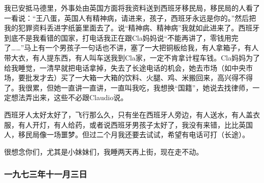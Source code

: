 \par {}
\par {}
\par 我已安抵马德里，外事处由英国方面将我资料送到西班牙移民局，移民局的人看了一看说：“王八蛋，英国人有精神病，请进来，孩子，西班牙永远是你的。”然后把我的犯罪资料丢进字纸篓里面去了。说“精神病、精神病”我就如此进来了。西班牙到底不是我看错的国家，打电话我正在跟Cla妈妈说“不能再讲了，零钱用完了……”马上有一个男孩子一句话也不讲，塞了一大把铜板给我，有人拿箱子，有人带大衣，有人提东西，有人叫车送我到Cla家，一定不肯拿计程车钱。Cla妈妈为了给我睡觉，一清早就把电话拿掉，失去了长途电话的机会，她去市场（如中央市场，要批发才去）买了一大箱一大箱的饮料、火腿、鸡、米搬回来，高兴得不得了。我很累，但她一直讲一直讲，一直叫我吃，我想换“国籍”，她说去找律师，一定想法弄出来，这些不必跟Claudio说。
\par 西班牙人太好太好了，飞行那么久，只有坐在西班牙人旁边，有人送水，有人盖衣服，有人开灯，有人给药，或者说西班牙男孩子太好了，我没有来错，比比英国人，移民局像一场噩梦。但过二个月我还要去试试，希望有电话可打（长途）。
\par 很想念你们，尤其是小妹妹们，我睡两天再上街，现在走不动。
\par {}



\subsubsection{一九七三年十一月三日}


